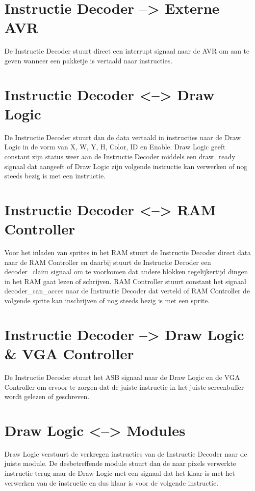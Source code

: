 \documentclass{scrartcl} %
\begin{document}
\section{Instructie Decoder --> Externe AVR}
De Instructie Decoder stuurt direct een interrupt signaal naar de AVR om aan te geven wanneer een pakketje is vertaald naar instructies.

\section{Instructie Decoder <--> Draw Logic}
De Instructie Decoder stuurt dan de data vertaald in instructies naar de Draw Logic in de vorm van X, W, Y, H, Color, ID en Enable. Draw Logic geeft constant zijn status weer aan de Instructie Decoder middels een draw\_ready signaal dat aangeeft of Draw Logic zijn volgende instructie kan verwerken of nog steeds bezig is met een instructie.

\section {Instructie Decoder <--> RAM Controller}
Voor het inladen van sprites in het RAM stuurt de Instructie Decoder direct data naar de RAM Controller en daarbij stuurt de Instructie Decoder een decoder\_claim signaal om te voorkomen dat andere blokken tegelijkertijd dingen in het RAM gaat lezen of schrijven. RAM Controller stuurt constant het signaal decoder\_can\_acces naar de Instructie Decoder dat verteld of RAM Controller de volgende sprite kan inschrijven of nog steeds bezig is met een sprite.

\section {Instructie Decoder --> Draw Logic \& VGA Controller}
De Instructie Decoder stuurt het ASB signaal naar de Draw Logic en de VGA Controller om ervoor te zorgen dat de juiste instructie in het juiste screenbuffer wordt gelezen of geschreven.

\section {Draw Logic <--> Modules}
Draw Logic verstuurt de verkregen instructies van de Instructie Decoder naar de juiste module. De desbetreffende module stuurt dan de naar pixels verwerkte instructie terug naar de Draw Logic met een signaal dat het klaar is met het verwerken van de instructie en dus klaar is voor de volgende instructie.
\end{document}
